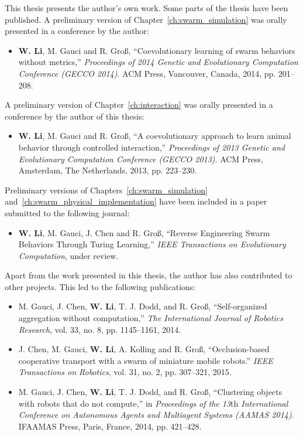 This thesis presents the author's own work. Some parts of the thesis have been published. A preliminary version of Chapter~\ref{ch:swarm_simulation} was orally presented in a conference by the author:
\begin{itemize}
%
\item \textbf{W. Li}, M. Gauci and R. Gro{\ss}, ``Coevolutionary learning of swarm behaviors without metrics,'' \textit{Proceedings of 2014 Genetic and Evolutionary Computation Conference (GECCO 2014)}. ACM Press, Vancouver, Canada, 2014, pp. 201--208.
%
\end{itemize}

A preliminary version of Chapter~\ref{ch:interaction} was orally presented in a conference by the author of this thesis:
\begin{itemize}
%
\item \textbf{W. Li}, M. Gauci and R. Gro{\ss}, ``A coevolutionary approach to learn animal behavior through controlled interaction,'' \textit{Proceedings of 2013 Genetic and Evolutionary Computation Conference (GECCO 2013)}. ACM Press, Amsterdam, The Netherlands, 2013, pp. 223--230.
%
\end{itemize}

Preliminary versions of Chapters~\ref{ch:swarm_simulation} and~\ref{ch:swarm_physical_implementation} have been included in a paper submitted to the following journal:
\begin{itemize}
%
\item \textbf{W. Li}, M. Gauci, J. Chen and R. Gro{\ss}, ``Reverse Engineering Swarm Behaviors Through Turing Learning,'' \textit{IEEE Transactions on Evolutionary Computation}, under review.
%
\end{itemize}

Apart from the work presented in this thesis, the author has also contributed to other projects. This led to the following publications:

\begin{itemize}
%
\item M. Gauci, J. Chen, \textbf{W. Li}, T. J. Dodd, and R. Gro{\ss}, ``Self-organized aggregation without computation,'' \textit{The International Journal of Robotics Research}, vol. 33, no. 8, pp. 1145--1161, 2014.
%
\item J. Chen, M. Gauci, \textbf{W. Li}, A. Kolling and R. Gro{\ss}, ``Occlusion-based cooperative transport with a swarm of miniature mobile robots.''\textit{ IEEE Transactions on Robotics}, vol. 31, no. 2, pp. 307--321, 2015.
%
\item M. Gauci, J. Chen, \textbf{W. Li}, T. J. Dodd, and R. Gro{\ss}, ``Clustering objects with robots that do not compute,'' in \textit{Proceedings of the 13${\textrm{th}}$ International Conference on Autonomous Agents and Multiagent Systems (AAMAS 2014)}. IFAAMAS Press, Paris, France, 2014, pp. 421--428.
%
\end{itemize}

